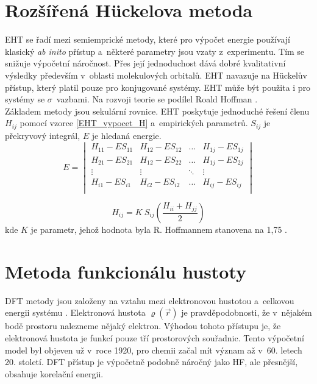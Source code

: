 \documentclass[
  printed, %
  table,   %
  lof,     %
  lot,     %
  oneside,
]{fithesis3}
\begin{document}
\section{Rozšířená Hückelova metoda}
EHT se řadí mezi semiemprické metody, které  pro výpočet energie používají klasický \textit{ab inito} přístup a~některé parametry jsou vzaty z~experimentu. Tím se snižuje výpočetní náročnost. Přes její jednoduchost dává dobré kvalitativní výsledky především v~oblasti molekulových orbitalů. EHT navazuje na Hückelův přístup, který platil pouze pro konjugované systémy. EHT může být použita i pro systémy se $\sigma$~vazbami. Na rozvoji teorie se podílel Roald Hoffman \cite{lowe2011quantum}. \\
Základem metody jsou sekulární rovnice. EHT poskytuje jednoduché řešení členu $H_{ij}$ pomocí vzorce \ref{EHT_vypocet_H} a~empirických parametrů. $S_{ij}$ je překryvový integrál, $E$ je hledaná energie.
\begin{equation}
E = \begin{vmatrix}
H_{11} - E S_{11} & H_{12} - E S_{12} & \dots & H_{1j} - E S_{1j} \\
H_{21} - E S_{21} & H_{12} - E S_{22} & \dots & H_{1j} - E S_{2j} \\
\vdots & \vdots &  \ddots & \vdots  \\
H_{i1} - E S_{i1} & H_{i2} - E S_{i2} & \dots & H_{ij} - E S_{ij} \\
\end{vmatrix}
\end{equation}


\begin{equation}
H_{ij} = K~S_{ij} \left( \frac{H_{ii} + H_{jj}}{2} \right)
\label{EHT_vypocet_H}
\end{equation}
kde $K$ je parametr, jehož hodnota byla R. Hoffmannem stanovena na 1,75 \cite{lowe2011quantum}.

\section{Metoda funkcionálu hustoty}
DFT metody jsou založeny na vztahu mezi elektronovou hustotou a~celkovou energii systému  . Elektronová hustota $\varrho(\vec{r})$ je pravděpodobnosti, že v~nějakém bodě prostoru nalezneme nějaký elektron.  Výhodou tohoto přístupu je, že elektronová hustota je funkcí pouze tří prostorových souřadnic. Tento výpočetní model byl objeven už v~roce 1920, pro chemii začal mít význam až v~60. letech 20. století. DFT přístup je výpočetně podobně náročný jako HF, ale přesnější, obsahuje korelační energii. \\
\end{document}
